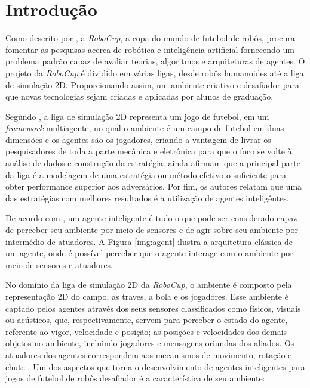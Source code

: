 \chapter{Introdução}

Como descrito por , a \textit{RoboCup}, a copa do mundo de futebol de
robôs, procura fomentar as pesquisas acerca de robótica e inteligência artificial fornecendo um
problema padrão capaz de avaliar teorias, algoritmos e arquiteturas de agentes. O projeto da
\textit{RoboCup} é dividido em várias ligas, desde robôs humanoides até a liga de simulação 2D.
Proporcionando assim, um ambiente criativo e desafiador para que novas tecnologias sejam criadas e
aplicadas por alunos de graduação.

Segundo , a liga de simulação 2D representa um jogo de futebol, em um
\textit{framework} multiagente, no qual o ambiente é um campo de futebol em duas dimensões e os
agentes são os jogadores, criando a vantagem de livrar os pesquisadores de toda a parte mecânica e
eletrônica para que o foco se volte à análise de dados e construção da estratégia.
 ainda afirmam que a principal parte da liga é a modelagem de uma
estratégia ou método efetivo o suficiente para obter performance superior aos adversários. Por fim,
os autores relatam que uma das estratégias com melhores resultados é a utilização de agentes
inteligêntes.

De acordo com , um agente inteligente é tudo o que pode ser
considerado capaz de perceber seu ambiente por meio de sensores e de agir sobre seu ambiente por
intermédio de atuadores. A Figura \ref{img:agent} ilustra a arquitetura clássica de um agente, onde
é possível perceber que o agente interage com o ambiente por meio de sensores e atuadores.


No domínio da liga de simulação 2D da \textit{RoboCup}, o ambiente é composto pela representação 2D
do campo, as traves, a bola e os jogadores. Esse ambiente é captado pelos agentes através dos seus
sensores classificados como físicos, visuais ou acústicos, que, respectivamente, servem para
perceber o estado do agente, referente ao vigor, velocidade e posição; as posições e velocidades dos
demais objetos no ambiente, incluindo jogadores e mensagens oriundas dos aliados. Os atuadores dos
agentes correspondem aos mecanismos de movimento, rotação e chute
\cite{robocupfederationofficialwebsite}. Um dos aspectos que torna o desenvolvimento de agentes
inteligentes para jogos de futebol de robôs desafiador é a  característica de seu ambiente:

